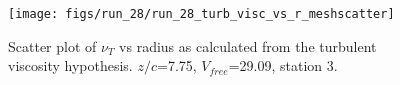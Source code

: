 \begin{figure}[H]
\centering
\texttt{[image: figs/run\_28/run\_28\_turb\_visc\_vs\_r\_meshscatter]}
\caption{Scatter plot of $\nu_T$ vs radius as calculated from the turbulent viscosity hypothesis. $z/c$=7.75, $V_{free}$=29.09, station 3.}
\label{fig:run_28_turb_visc_vs_r_meshscatter}
\end{figure}


